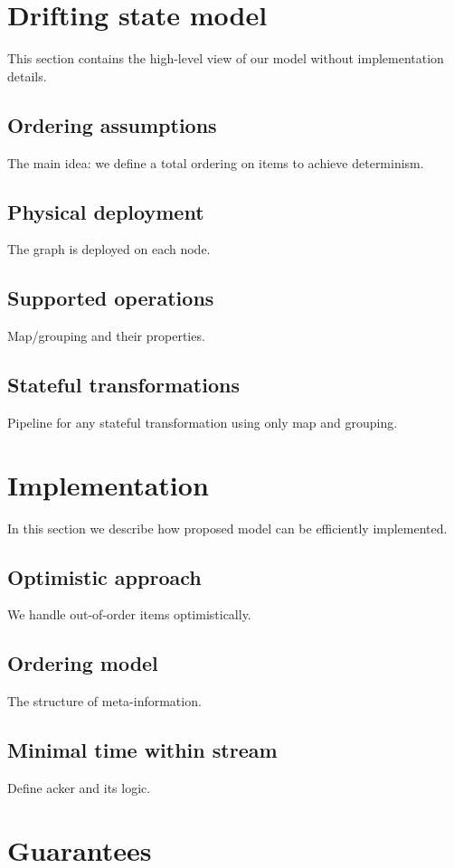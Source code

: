 \documentclass[sigconf]{acmart}
\theoremstyle{remark}
\begin{document}
\section {Drifting state model}
This section contains the high-level view of our model without implementation details.

\subsection{Ordering assumptions}
The main idea: we define a total ordering on items to achieve determinism.

\subsection{Physical deployment}
The graph is deployed on each node.

\subsection{Supported operations}
Map/grouping and their properties.

\subsection{Stateful transformations}
Pipeline for any stateful transformation using only map and grouping. 

\section {Implementation}
In this section we describe how proposed model can be efficiently implemented.

\subsection{Optimistic approach}
We handle out-of-order items optimistically.

\subsection{Ordering model}
The structure of meta-information.

\subsection{Minimal time within stream}
Define acker and its logic.

\section{Guarantees}
\end{document}
